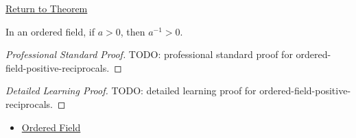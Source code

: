 \newpage
{}
\label{prf:ordered-field-positive-reciprocals}

\begin{remark*}[Return]
\hyperref[thm:ordered-field-positive-reciprocals]{Return to Theorem}
\end{remark*}

\begin{theorem*}
In an ordered field, if $a>0$, then $a^{-1}>0$.
\end{theorem*}

\begin{proof}[Professional Standard Proof]
\LRAProofBodyStart
TODO: professional standard proof for ordered-field-positive-reciprocals.
\end{proof}

\begin{proof}[Detailed Learning Proof]
\LRAProofBodyStart
TODO: detailed learning proof for ordered-field-positive-reciprocals.
\end{proof}

\begin{remark*}
\end{remark*}

\begin{dependencies}
\begin{itemize}
  \item \hyperref[def:ordered-field]{Ordered Field}
\end{itemize}
\end{dependencies}

\clearpage
